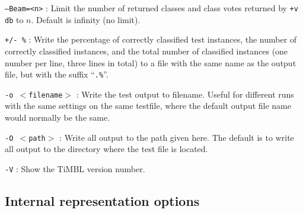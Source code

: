 \documentclass{book}
\begin{document}
\begin{description}
\item {\tt --Beam=<n>} : Limit the number of returned classes and class
  votes returned by {\tt +v db} to $n$. Default is infinity (no limit).

\item {\tt +/- \%} : Write the percentage of correctly classified test
  instances, the number of correctly classified instances, and the
  total number of classified instances (one number per line, three
  lines in total) to a file with the same name as the output file, but
  with the suffix ``{\tt .\%}''.

\item {\tt -o $<$filename$>$} : Write the test output to filename. Useful
  for different runs with the same settings on the same testfile,
  where the default output file name would normally be the same.

\item {\tt -O $<$path$>$} : Write all output to the path given here. The
  default is to write all output to the directory where the test file
  is located.

\item {\tt -V} : Show the TiMBL version number.

\end{description}

\subsection{Internal representation options}
\end{document}
